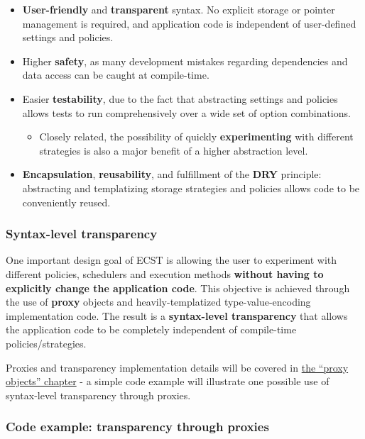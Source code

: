 \documentclass[twoside, 12pt, a4paper, openany]{book}
\providecommand{\tightlist}{%
  \setlength{\itemsep}{0pt}\setlength{\parskip}{0pt}}
\begin{document}
\begin{itemize}
\item
  \textbf{User-friendly} and \textbf{transparent} syntax. No explicit
  storage or pointer management is required, and application code is
  independent of user-defined settings and policies.
\item
  Higher \textbf{safety}, as many development mistakes regarding
  dependencies and data access can be caught at compile-time.
\item
  Easier \textbf{testability}, due to the fact that abstracting settings
  and policies allows tests to run comprehensively over a wide set of
  option combinations.

  \begin{itemize}
  \tightlist
  \item
    Closely related, the possibility of quickly \textbf{experimenting}
    with different strategies is also a major benefit of a higher
    abstraction level.
  \end{itemize}
\item
  \textbf{Encapsulation}, \textbf{reusability}, and fulfillment of the
  \textbf{DRY} principle: abstracting and templatizing storage
  strategies and policies allows code to be conveniently reused.
\end{itemize}

\hypertarget{ecstoverview_syntaxtransp}{\subsubsection{Syntax-level
transparency}\label{ecstoverview_syntaxtransp}}

One important design goal of ECST is allowing the user to experiment
with different policies, schedulers and execution methods
\textbf{without having to explicitly change the application code}. This
objective is achieved through the use of \textbf{proxy} objects and
heavily-templatized type-value-encoding implementation code. The result
is a \textbf{syntax-level transparency} that allows the application code
to be completely independent of compile-time policies/strategies.

Proxies and transparency implementation details will be covered in
\protect\hyperlink{chap_proxies}{the ``proxy objects'' chapter} - a
simple code example will illustrate one possible use of syntax-level
transparency through proxies.

\subsubsection{Code example: transparency through
proxies}\label{code-example-transparency-through-proxies}
\end{document}
